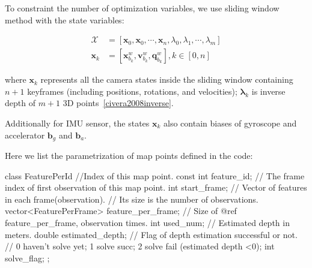 \documentclass[12pt]{report}   %
\begin{document}
To constraint the number of optimization variables, we use sliding window method with the state variables:


\begin{equation}
\begin{aligned}
\mathbf{\mathcal{X}} &= \left[  \mathbf{x}_0, \mathbf{x}_0, \cdots, \mathbf{x}_n, \lambda_0, \lambda_1, \cdots, \lambda_m  \right] \\
\mathbf{x}_k &= \left[  \mathbf{x}_{b_k}^w, \mathbf{v}_{b_k}^w, \mathbf{q}_{b_k}^w  \right], k\in{[0, n]} 
\end{aligned} \label{states}
\end{equation}

where $\mathbf{x}_k$ represents all the camera states inside the sliding window containing $n+1$ keyframes (including positions, rotations, and velocities); $\mathbf{\lambda}_k$ is inverse depth of $m+1$ 3D points~\ref{civera2008inverse}.

Additionally for IMU sensor, the states $\mathbf{x}_k$ also contain biases of gyroscope and accelerator $\mathbf{b}_g$ and $\mathbf{b}_a$.


Here we list the parametrization of map points defined in the code:

\begin{cppcode}
class FeaturePerId {
//Index of this map point.
const int feature_id;
// The frame index of first observation of this map point.
int start_frame;
// Vector of features in each frame(observation). 
// Its size is the number of observations.
vector<FeaturePerFrame> feature_per_frame;
// Size of @ref feature\_per\_frame, observation times.
int used_num;
// Estimated depth in meters.
double estimated_depth;
// Flag of depth estimation successful or not.
// 0 haven't solve yet; 1 solve succ; 2 solve fail (estimated depth <0);
int solve_flag;
};
\end{cppcode}
\end{document}
